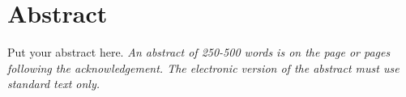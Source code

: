 \chapter*{Abstract}
\vspace{-1em}
Put your abstract here. \emph{An abstract of 250-500 words is on the page or pages following the acknowledgement. The electronic version of the abstract must use standard text only.}

